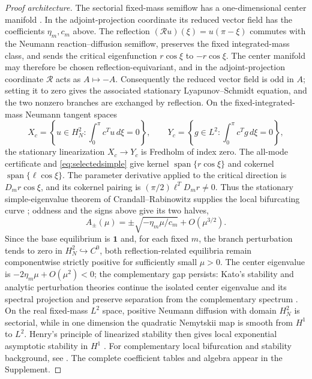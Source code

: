 \documentclass[11pt]{article}
\theoremstyle{definition}
\newcommand{\1}{\mathbf 1}
\begin{document}
\begin{proof}[Proof architecture]
The sectorial fixed-mass semiflow has a one-dimensional center manifold
\cite[Chapter~6]{Henry1981}.  In the adjoint-projection coordinate its reduced
vector field has the coefficients $\eta_m,c_m$ above.  The reflection
$(\mathcal Ru)(\xi)=u(\pi-\xi)$ commutes with the Neumann
reaction--diffusion semiflow, preserves the fixed integrated-mass class, and
sends the critical eigenfunction $r\cos\xi$ to $-r\cos\xi$.  The center
manifold may therefore be chosen reflection-equivariant, and in the
adjoint-projection coordinate $\mathcal R$ acts as $A\mapsto-A$.  Consequently
the reduced vector field is odd in $A$; setting it to zero gives the associated
stationary Lyapunov--Schmidt equation, and the two nonzero branches are
exchanged by reflection.  On the fixed-integrated-mass Neumann tangent spaces
\[
 X_c=\left\{u\in H_N^2:\int_0^\pi c^Tu\,d\xi=0\right\},\qquad
 Y_c=\left\{g\in L^2:\int_0^\pi c^Tg\,d\xi=0\right\},
\]
the stationary linearization $X_c\to Y_c$ is Fredholm of index zero.  The
all-mode certificate and \eqref{eq:selectedsimple} give kernel
$\operatorname{span}\{r\cos\xi\}$ and cokernel
$\operatorname{span}\{\ell\cos\xi\}$.  The parameter derivative applied to
the critical direction is $D_mr\cos\xi$, and its cokernel pairing is
$(\pi/2)\ell^TD_mr\ne0$.  Thus the stationary simple-eigenvalue theorem
of Crandall--Rabinowitz supplies the local bifurcating curve
\cite{CrandallRabinowitz1971}; oddness and the signs above give its two halves,
\[
 A_\pm(\mu)=\pm\sqrt{-\eta_m\mu/c_m}+O(\mu^{3/2}).
\]
Since the base equilibrium is $\1$ and, for each fixed $m$, the branch
perturbation tends to zero in $H_N^2\hookrightarrow C^0$, both
reflection-related equilibria remain componentwise strictly positive for
sufficiently small $\mu>0$.
The center eigenvalue is $-2\eta_m\mu+O(\mu^2)<0$; the complementary gap
persists: Kato's stability and analytic perturbation theories continue the
isolated center eigenvalue and its spectral projection and preserve separation
from the complementary spectrum \cite[Chapters~IV and~VII]{Kato1995}.  On the
real fixed-mass $L^2$ space, positive Neumann diffusion with domain $H_N^2$ is
sectorial, while in one dimension the quadratic Nemytskii map is smooth from
$H^1$ to $L^2$.  Henry's principle of linearized stability then gives local
exponential asymptotic stability in $H^1$ \cite[Chapter~5]{Henry1981}.  For
complementary local bifurcation and stability background, see
\cite[Chapter~I]{Kielhoefer2012}.  The complete coefficient tables and algebra
appear in the Supplement.
\end{proof}
\end{document}
